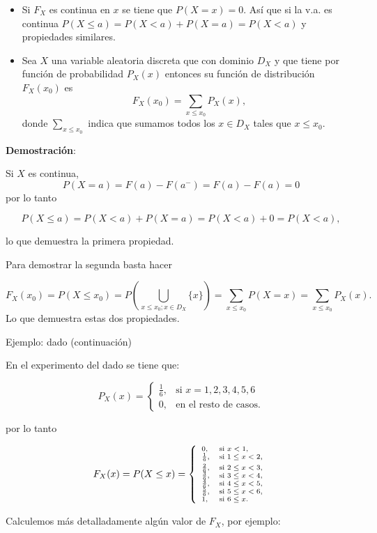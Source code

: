 \documentclass[
  letterpaper,
  DIV=11,
  numbers=noendperiod]{scrreprt}
\providecommand{\tightlist}{%
  \setlength{\itemsep}{0pt}\setlength{\parskip}{0pt}}\usepackage{longtable,booktabs,array}
\begin{document}
\begin{itemize}
\tightlist
\item
  Si \(F_X\) es continua en \(x\) se tiene que \(P(X=x)=0\). Así que si
  la v.a. es continua \(P(X\leq a)=P(X< a)+P(X=a)=P(X<a)\) y propiedades
  similares.
\item
  Sea \(X\) una variable aleatoria discreta que con dominio \(D_X\) y
  que tiene por función de probabilidad \(P_{X}(x)\) entonces su función
  de distribución \(F_{X}(x_0)\) es
  \[F_{X}(x_0)=\sum_{x\leq x_0} P_{X}(x),\] donde
  \(\sum\limits_{x\leq x_0}\) indica que sumamos todos los \(x \in D_X\)
  tales que \(x\leq
  x_0.\)
\end{itemize}

\textbf{Demostración}:

Si \(X\) es continua, \[P(X=a)=F(a)-F(a^{-})=F(a)-F(a)=0\] por lo tanto

\[P(X\leq a)=P(X<a)+P(X=a)= P(X<a)+0= P(X<a),\]

lo que demuestra la primera propiedad.

Para demostrar la segunda basta hacer

\[ 
F_{X}(x_0)= P(X\leq x_0)=P\left(\bigcup_{x\leq
x_0; x\in D_X} \{x\}\right)= \sum_{x\leq x_0}P(X=x)= \sum_{x\leq x_0}P_{X}(x).
\] Lo que demuestra estas dos propiedades.

Ejemplo: dado (continuación)

En el experimento del dado se tiene que:

\[P_{X}(x)=\left\{\begin{array}{ll} \frac16, & \mbox{si } x=1,2,3,4,5,6\\ 0, & \mbox{en el resto de casos.}\end{array}\right.\]

por lo tanto

\[\scriptsize{F_{X}(x)=P(X\leq x)=\left\{\begin{array}{ll}
   0, & \mbox{si } x<1,\\
   \frac16, &\mbox{si } 1\leq x<2,\\[1ex]
   \frac26, &\mbox{si } 2\leq x<3,\\
   \frac36, &\mbox{si } 3\leq x<4,\\
   \frac46, &\mbox{si } 4\leq x<5,\\
   \frac56, &\mbox{si } 5\leq x<6,\\
   1, &\mbox{si } 6\leq x.\end{array}\right.}\]

Calculemos más detalladamente algún valor de \(F_{X}\), por ejemplo:
\end{document}

